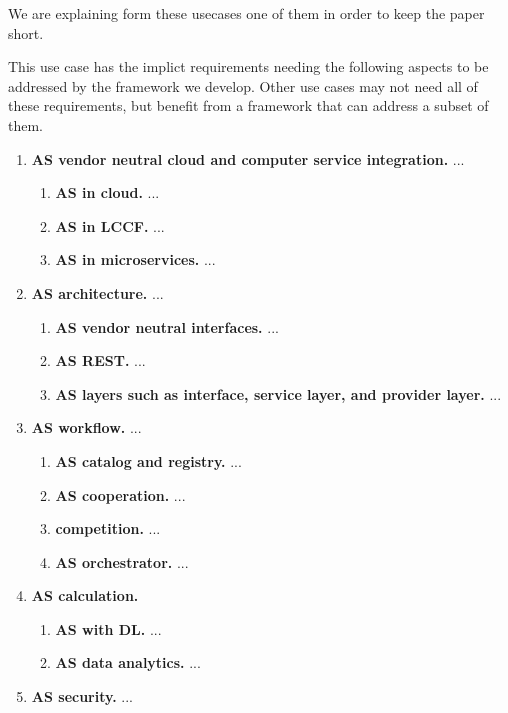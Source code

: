 We are explaining form these usecases one of them in order to keep the paper short. 



This use case has the implict requirements needing the following
aspects to be addressed by the framework we develop. Other use cases
may not need all of these requirements, but benefit from a framework
that can address a subset of them.

\begin{enumerate}

\item{\bf AS vendor neutral cloud and computer service integration.} ...

  \begin{enumerate}
  \item {\bf AS in cloud.} ...
  \item {\bf AS in LCCF.} ...
  \item {\bf AS in microservices.} ...
  \end{enumerate}

\item{\bf AS architecture.} ...

  \begin{enumerate}
  \item{\bf AS vendor neutral interfaces.} ...
  \item{\bf AS REST.} ...
  \item{\bf AS layers such as interface, service layer, and provider layer.} ...
  \end{enumerate}

\item{\bf AS workflow.} ...

  \begin{enumerate}
  \item{\bf AS catalog and registry.} ...
  \item{\bf AS cooperation.} ...
  \item{\bf competition.} ...
  \item{\bf AS orchestrator.} ...
  \end{enumerate}


\item{\bf AS calculation.}

  \begin{enumerate}
  \item{\bf AS with DL.} ...
  \item{\bf AS data analytics.} ...
  \end{enumerate}

\item{\bf AS security.} ...

\end{enumerate}


